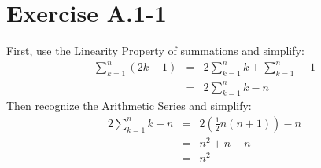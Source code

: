 \documentclass{article}
\begin{document}
\section*{Exercise A.1-1}

First, use the Linearity Property of summations and simplify:
\begin{eqnarray*}
	\sum_{k=1}^n \left ( 2k-1 \right ) & = & 2 \sum_{k=1}^n k + \sum_{k=1}^n -1 \\
	& = & 2 \sum_{k=1}^n k - n
\end{eqnarray*}
Then recognize the Arithmetic Series and simplify:
\begin{eqnarray*}
	2 \sum_{k=1}^n k - n & = & 2 \left ( \frac{1}{2} n \left ( n+1 \right ) \right ) - n \\
	& = & n^2 + n - n \\
	& = & n^2
\end{eqnarray*}
\end{document}
